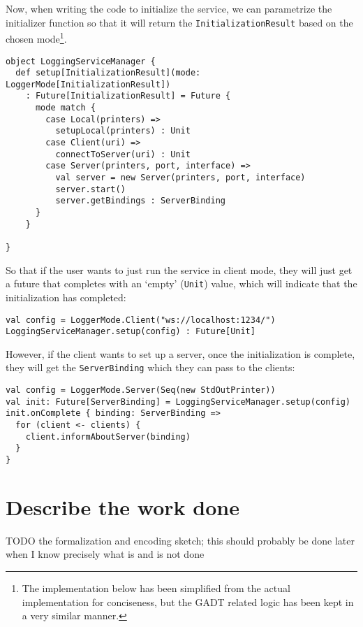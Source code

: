 Now, when writing the code to initialize the service, we can parametrize the initializer function so that it will return the \texttt{InitializationResult} based on the chosen mode\footnote{The implementation below has been simplified from the actual implementation for conciseness, but the GADT related logic has been kept in a very similar manner.}.

\begin{verbatim}
object LoggingServiceManager {
  def setup[InitializationResult](mode: LoggerMode[InitializationResult])
    : Future[InitializationResult] = Future {
      mode match {
        case Local(printers) =>
          setupLocal(printers) : Unit
        case Client(uri) =>
          connectToServer(uri) : Unit
        case Server(printers, port, interface) =>
          val server = new Server(printers, port, interface)
          server.start()
          server.getBindings : ServerBinding
      }
    }
    
}
\end{verbatim}

So that if the user wants to just run the service in client mode, they will just get a future that completes with an `empty' (\texttt{Unit}) value, which will indicate that the initialization has completed:

\begin{verbatim}
val config = LoggerMode.Client("ws://localhost:1234/")
LoggingServiceManager.setup(config) : Future[Unit]
\end{verbatim}

However, if the client wants to set up a server, once the initialization is complete, they will get the \texttt{ServerBinding} which they can pass to the clients:

\begin{verbatim}
val config = LoggerMode.Server(Seq(new StdOutPrinter))
val init: Future[ServerBinding] = LoggingServiceManager.setup(config)
init.onComplete { binding: ServerBinding =>
  for (client <- clients) {
    client.informAboutServer(binding)
  }
}
\end{verbatim}

\section{Describe the work done}

TODO the formalization and encoding sketch; this should probably be done later when I know precisely what is and is not done
